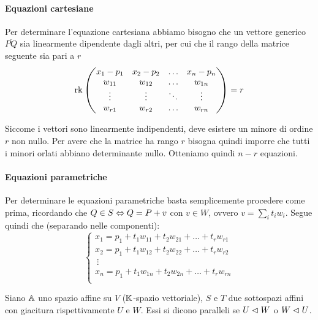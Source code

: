 \documentclass{article}     %
\begin{document}
\begin{ex}[Generalizziano l'esempio seguente considerando lo spazio affine $\A$ di dimensione $n$ con il sistema di riferimento canonico e scriviamo le equazioni del sottospazio affine $S$ passante per $P=(p_1, \dots, p_n)$ con giacitura $W=\langle w_1,\dots, w_r\rangle$, dove $w_i=(w_{i1},\dots,w_{in})$ e i $w_i$ sono linearmente indipendenti.]
\paragraph*{Equazioni cartesiane}
Per determinare l'equazione cartesiana abbiamo bisogno che un vettore generico $\overline{PQ}$ sia linearmente dipendente dagli altri, per cui che il rango della matrice seguente sia pari a $r$
\[\operatorname{rk}\begin{pmatrix}
    x_1-p_1&x_2-p_2&\dots&x_n-p_n\\
    w_{11}&w_{12} & \dots & w_{1n}\\
    \vdots&\vdots&\ddots&\vdots\\
    w_{r1}&w_{r2} & \dots & w_{rn}\\
\end{pmatrix}=r\]

Siccome i vettori sono linearmente indipendenti, deve esistere un minore di ordine $r$ non nullo. Per avere che la matrice ha rango $r$ bisogna quindi imporre che tutti i minori orlati abbiano determinante nullo. Otteniamo quindi $n-r$ equazioni.
\paragraph*{Equazioni parametriche}
Per determinare le equazioni parametriche basta semplicemente procedere come prima, ricordando che $Q\in S \Leftrightarrow Q=P+v $ con $v\in W$, ovvero $v=\sum_it_iw_i$. Segue quindi che (separando nelle componenti):
\[\begin{cases}
    x_1=p_1+t_1w_{11}+t_2w_{21}+\dots+t_rw_{r1}\\
    x_2=p_1+t_1w_{12}+t_2w_{22}+\dots+t_rw_{r2}\\
    \ \vdots\\
    x_n=p_1+t_1w_{1n}+t_2w_{2n}+\dots+t_rw_{rn}\\
\end{cases}\]
\end{ex}

\begin{boxdef}
    Siano $\A$ uno spazio affine su $V$ ($\mathbb{K}$-spazio vettoriale), $S$ e $T$ due sottospazi affini con giacitura rispettivamente $U$ e $W$. Essi si dicono paralleli se $U\vartriangleleft W$ o $W\vartriangleleft U$.
\end{boxdef}
\end{document}
